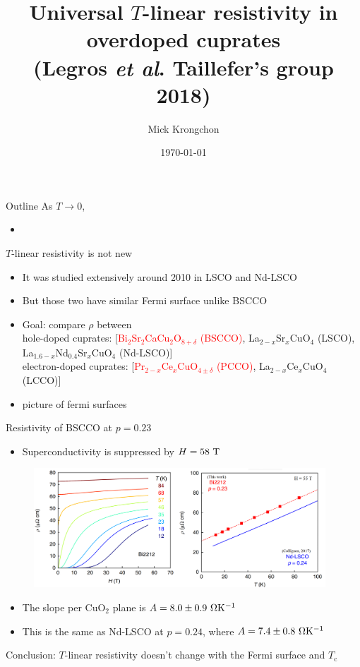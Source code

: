 \documentclass[aspectratio=169]{beamer}
\title[]{\texorpdfstring{Universal $T$-linear resistivity in overdoped cuprates \\(Legros \textit{et al}. Taillefer's group 2018)}{}}
\author{Mick Krongchon}
\institute{University of Illinois at Urbana-Champaign}
\date{\today}
\newcommand{\red}[1]{\textcolor{red}{#1}}
\begin{document}
\begin{frame}
\titlepage
\end{frame}


\begin{frame}{Outline}
As $T \to 0$,
\begin{itemize}
\item
\end{itemize}
\end{frame}

\begin{frame}{$T$-linear resistivity is not new}
\begin{itemize}
\item It was studied extensively around 2010 in LSCO and Nd-LSCO
\item But those two have similar Fermi surface unlike BSCCO
\item Goal: compare $\rho$ between
\\ hole-doped cuprates: [\red{Bi$_2$Sr$_2$CaCu$_2$O$_{8+\delta}$ (BSCCO)},  La$_{2-x}$Sr$_{x}$CuO$_{4}$ (LSCO), La$_{1.6-x}$Nd$_{0.4}$Sr$_{x}$CuO$_{4}$ (Nd-LSCO)]
\\ electron-doped cuprates: [\red{Pr$_{2-x}$Ce$_x$CuO$_{4\pm\delta}$ (PCCO)}, La$_{2-x}$Ce$_x$CuO$_4$ (LCCO)]
\item picture of fermi surfaces
\end{itemize}
\end{frame}

\begin{frame}{Resistivity of BSCCO at $p = 0.23$}
\begin{itemize}
\item Superconductivity is suppressed by $H = 58~\rm{T}$
\end{itemize}
\begin{figure}
\includegraphics[width=4.3in]{figs/rho_bscco_2.png}
\end{figure}
\begin{itemize}
\item The slope per CuO$_2$ plane is $A = 8.0 \pm 0.9~\rm{\Omega K^{-1}}$
\item This is the same as Nd-LSCO at $p = 0.24$, where $A = 7.4 \pm 0.8~\rm{\Omega K^{-1}}$
\end{itemize}
Conclusion: $T$-linear resistivity doesn't change with the Fermi surface and $T_\text{c}$
\end{frame}
\end{document}
